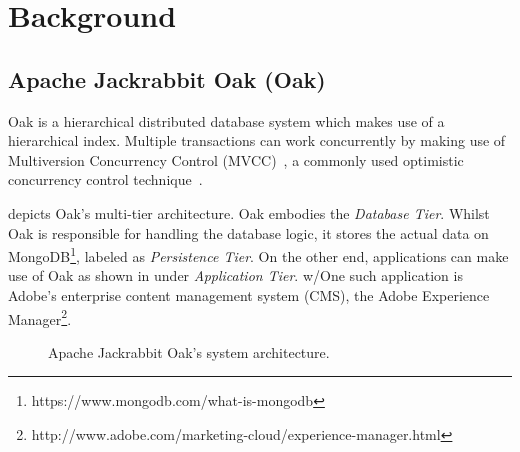 \documentclass[abstracton,12pt]{scrartcl}
\theoremstyle{definition}
\begin{document}
\section{Background}

\subsection{Apache Jackrabbit Oak (Oak)}

Oak is a hierarchical distributed database system which makes use of a
hierarchical index. Multiple transactions can work concurrently by making use of
Multiversion Concurrency Control (MVCC)~\cite{GW02}, a commonly used optimistic
concurrency control technique~\cite{TM11}.

 depicts Oak's multi-tier architecture. Oak embodies the
\textit{Database Tier}.
Whilst Oak is responsible for handling the database logic, it stores the actual
data on MongoDB\footnote{https://www.mongodb.com/what-is-mongodb}, labeled as
\textit{Persistence Tier}. On the other end, applications can make use of Oak as
shown in  under \textit{Application Tier}.
w/One such application is Adobe's enterprise content management system (CMS),
the Adobe Experience
Manager\footnote{http://www.adobe.com/marketing-cloud/experience-manager.html}.

\begin{figure}[h]
  \begin{center}
  \end{center}
  \caption{Apache Jackrabbit Oak's system architecture.}
  \label{fig:architecture}
\end{figure}
\end{document}
